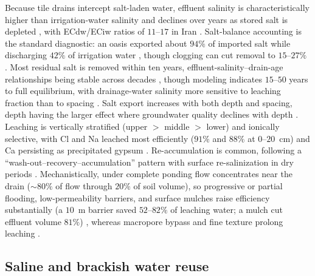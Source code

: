 \documentclass[11pt]{article}
\begin{document}
Because tile drains intercept salt-laden water, effluent salinity is
characteristically higher than irrigation-water salinity and declines over years
as stored salt is depleted \parencite{Li2022,Karegoudar2022}, with ECdw/ECiw
ratios of $11$--$17$ in Iran \parencite{Akram2013}. Salt-balance accounting is
the standard diagnostic: an oasis exported about $94\%$ of imported salt while
discharging $42\%$ of irrigation water \parencite{Askri2022}, though clogging can
cut removal to $15$--$27\%$ \parencite{BenAissa2013,HajAmor2019}. Most residual
salt is removed within ten years, effluent-salinity--drain-age relationships
being stable across decades \parencite{JOHNSTON1993}, though modeling indicates
$15$--$50$ years to full equilibrium, with drainage-water salinity more sensitive
to leaching fraction than to spacing \parencite{Kelleners2000}. Salt export
increases with both depth and spacing, depth having the larger effect where
groundwater quality declines with depth \parencite{GRISMER1993,KAMRA1991,KAMRA1994}.
Leaching is vertically stratified (upper $>$ middle $>$ lower) and ionically
selective, with Cl and Na leached most efficiently ($91\%$ and $88\%$ at
$0$--$20$~cm) and Ca persisting as precipitated gypsum
\parencite{Chen2022,Qian2025,Yu2016}. Re-accumulation is common, following a
``wash-out--recovery--accumulation'' pattern with surface re-salinization in dry
periods \parencite{Zhu2025b,Dou2022,Shi2021b}. Mechanistically, under complete
ponding flow concentrates near the drain ($\sim80\%$ of flow through $20\%$ of
soil volume), so progressive or partial flooding, low-permeability barriers, and
surface mulches raise efficiency substantially (a $10$~m barrier saved
$52$--$82\%$ of leaching water; a mulch cut effluent volume $81\%$)
\parencite{RAO1991,Youngs2000,Yu2018,Zhang2022}, whereas macropore bypass and
fine texture prolong leaching \parencite{Xin2016,MANN1982}.

\subsection{Saline and brackish water reuse}
\end{document}

